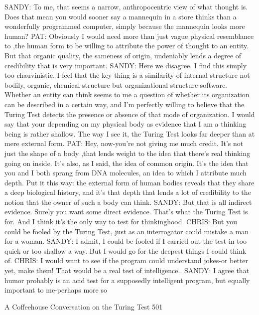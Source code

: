 SANDY: To me, that seems a narrow, anthropocentric view of what thought is. Does
   that mean you would sooner say a mannequin in a store thinks than a wonderfully
   programmed computer, simply because the mannequin looks more human?
PAT: Obviously I would need more than just vague physical resemblance to ,the
   human form to be willing to attribute the power of thought to an entity. But that
   organic quality, the sameness of origin, undeniably lends a degree of credibility
   that is very important.
SANDY: Here we disagree. I find this simply too chauvinistic. I feel that the key
   thing is a similarity of internal structure-not bodily, organic, chemical structure
   but organizational structure-software. Whether an entity can think seems to me a
   question of whether its organization can be described in a certain way, and I'm
   perfectly willing to believe that the Turing Test detects the presence or absence
   of that mode of organization. I would say that your depending on my physical
   body as evidence that I am a thinking being is rather shallow. The way I see it,
   the Turing Test looks far deeper than at mere external form.
PAT: Hey, now-you're not giving me much credit. It's not just the shape of a body
   ,that lends weight to the idea that there's real thinking going on inside. It's also, as
   I said, the idea of common origin. It's the idea that you and I both sprang from
   DNA molecules, an idea to which I attribute much depth. Put it this way: the
   external form of human bodies reveals that they share a deep biological history,
   and it's that depth that lends a lot of credibility to the notion that the owner of
   such a body can think.
SANDY: But that is all indirect evidence. Surely you want some direct evidence.
   That's what the Turing Test is for. And I think it's the only way to test for
   thinkinghood.
CHRIS: But you could be fooled by the Turing Test, just as an interrogator could
   mistake a man for a woman.
SANDY: I admit, I could be fooled if I carried out the test in too quick or too shallow
   a way. But I would go for the deepest things I could think of.
CHRIS: I would want to see if the program could understand jokes-or better yet, make
   them! That would be a real test of intelligence..
SANDY: I agree that humor probably is an acid test for a supposedly intelligent
   program, but equally important to me-perhaps more so




A Coffeehouse Conversation on the Turing Test                                          501

